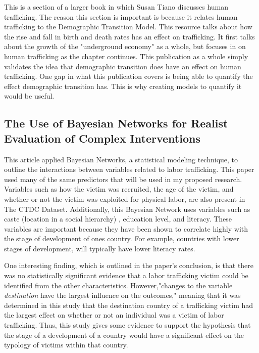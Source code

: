 \documentclass{article} %
\begin{document}
This is a section of a larger book in which Susan Tiano discusses human trafficking. The reason this section is important is because it relates human trafficking to the Demographic Transition Model. This resource talks about how the rise and fall in birth and death rates has an effect on trafficking. It first talks about the growth of the "underground economy" as a whole, but focuses in on human trafficking as the chapter continues. This publication as a whole simply validates the idea that demographic transition does have an effect on human trafficking. One gap in what this publication covers is being able to quantify the effect demographic transition has. This is why creating models to quantify it would be useful.
\nocite{SlaveBook}

\subsection*{The Use of Bayesian Networks for Realist Evaluation of Complex Interventions}

This article applied Bayesian Networks, a statistical modeling technique, to outline the interactions between variables related to labor trafficking. This paper used many of the same predictors that will be used in my proposed research. Variables such as how the victim was recruited, the age of the victim, and whether or not the victim was exploited for physical labor, are also present in The CTDC Dataset. Additionally, this Bayesian Network uses variables such as caste (location in a social hierarchy) , education level, and literacy. These variables are important because they have been shown to correlate highly with the stage of development of ones country. For example, countries with lower stages of development, will typically have lower literacy rates. 

One interesting finding, which is outlined in the paper's conclusion, is that there was no statistically significant evidence that a labor trafficking victim could be identified from the other characteristics. However,"changes to the variable \emph{destination} have the largest influence on the outcomes," meaning that it was determined in this study that the destination country of a trafficking victim had the largest effect on whether or not an individual was a victim of labor trafficking. Thus, this study gives some evidence to support the hypothesis that the stage of a development of a country would have a significant effect on the typology of victims within that country.
\nocite{Bayesian}
\end{document}
